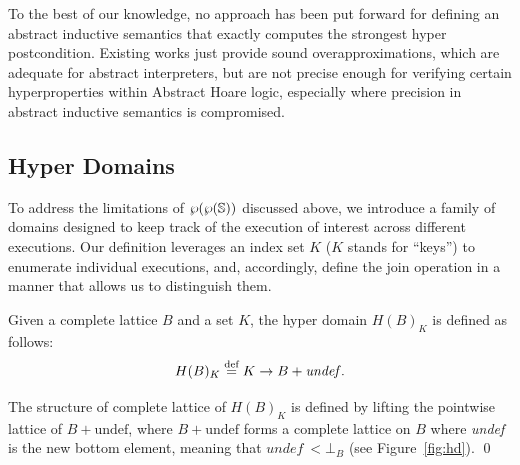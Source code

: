 \documentclass[
  10pt,       %
  twoside,    %
  a4paper,    %
  english,    %
  tikz,       %
  openright,  %
]{book}
\begin{document}
To the best of our knowledge, no approach has been put forward for defining 
an abstract inductive semantics that exactly
computes the strongest hyper postcondition. Existing works just provide sound
overapproximations, which are adequate for abstract interpreters, but are not 
precise enough for verifying certain hyperproperties within
Abstract Hoare logic, especially where precision in abstract inductive
semantics is compromised.


\subsection{Hyper Domains}

To address the limitations of $\wp(\wp(\mathbb{S}))$ discussed above, we introduce a 
family of domains designed to keep track of the execution of
interest across different executions. Our definition leverages an index set $K$ ($K$ stands for ``keys'') 
to enumerate
individual executions, and, accordingly, define the join operation in a manner that allows us
to distinguish them. 

\begin{definition}\label{def:hd}
  Given a complete lattice $B$ and a set $K$, the hyper domain $H(B)_K$ is
  defined as follows: $$H(B)_K \stackrel{\text{def}}{=} K \to B + \textit{undef}\, .$$

\noindent
  The structure of complete lattice of $H(B)_K$ is defined  by lifting the
  pointwise lattice of $B + \text{undef}$, where $B + \text{undef}$ forms a
  complete lattice on $B$ where \textit{undef} is the new bottom element,
  meaning that $\textit{undef} \: \mathrel{<} \bot_B$ (see Figure~\ref{fig:hd}). \qed
\end{definition}
\end{document}
